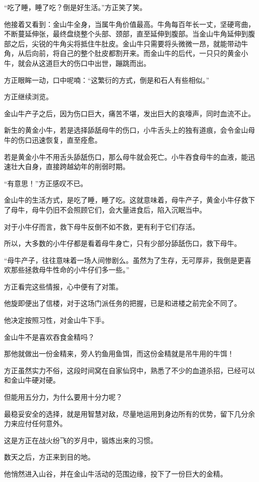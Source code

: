 \begin{this_body}
“吃了睡，睡了吃？倒是好生活。”方正笑了笑。

他接着又看到：金山牛全身，当属牛角价值最高。牛角每百年长一丈，坚硬弯曲，不断蔓延伸张，最终盘绕整个头部、颈部，直至延伸到腹部。当金山牛角延伸到腹部之后，尖锐的牛角尖将抵住牛肚皮。金山牛只需要将头微微一昂，就能带动牛角，从后向前，将自己的整个肚皮都割开来。而金山牛的后代，一只只的黄金小牛，就会从这道巨大的伤口中出世，蹦跳而出。

方正眼眸一动，口中呢喃：“这繁衍的方式，倒是和石人有些相似。”

方正继续浏览。

金山牛产子之后，因为伤口巨大，痛苦不堪，发出巨大的哀嚎声，同时血流不止。

新生的黄金小牛，若是选择舔舐母牛的伤口，小牛舌头上的独有道痕，会令金山母牛的伤口迅速恢复，直至痊愈。

若是黄金小牛不用舌头舔舐伤口，那么母牛就会死亡。小牛吞食母牛的血液，能迅速壮大自身，直接跨越幼年的削弱时期。

“有意思！”方正感叹不已。

金山牛的生活方式，是吃了睡，睡了吃。这就意味着，母牛产子，黄金小牛仔救下了母牛，母牛仍旧不会照顾它们，会大量进食后，陷入沉眠当中。

对于小牛仔而言，救下母牛反倒不如不救，更有利于它们存活。

所以，大多数的小牛仔都是看着母牛身亡，只有少部分舔舐伤口，救下母牛。

“母牛产子，往往意味着一场人间惨剧么。虽然为了生存，无可厚非，我倒是更喜欢那些拯救母牛性命的小牛仔们多一些。”

方正看完这些情报，心中便有了对策。

他旋即便出了信楼，对于这场门派任务的把握，已是和进楼之前完全不同了。

他决定按照习性，对金山牛下手。

金山牛不是喜欢吞食金精吗？

那他就做出一份金精来，旁人钓鱼用鱼饵，而这份金精就是吊牛用的牛饵！

方正虽然实力不俗，这段时间窝在自家仙窍中，熟悉了不少的血道杀招，已经可以和金山牛硬对硬。

但能用五分力，为什么要用十分力呢？

最稳妥安全的选择，就是用智慧对敌，尽量地运用到身边所有的优势，留下几分余力来应付任何意外。

这是方正在战火纷飞的岁月中，锻炼出来的习惯。

数天之后，方正来到目的地。

他悄然进入山谷，并在金山牛活动的范围边缘，投下了一份巨大的金精。


\end{this_body}
